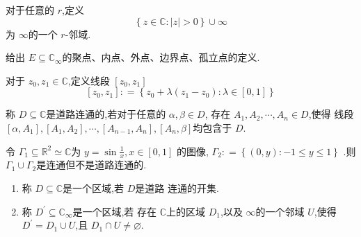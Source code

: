 \documentclass[../../复变函数.tex]{subfiles}
\begin{document}
\begin{definition}
    对于任意的 \(  r   \),定义 \[
    \left\{ z \in \mathbb{C} : \left| z \right|>0  \right\}\cup \infty
    \] 为 \(  \infty  \)的一个 \(  r  \)-邻域.  
\end{definition}

\begin{exercise}
    给出 \(  E\subseteq \mathbb{C} _{\infty}  \)的聚点、内点、外点、边界点、孤立点的定义. 
\end{exercise}

\hspace*{\fill} 


\begin{definition}
    对于 \(  z_0,z_1 \in \mathbb{C}   \),定义线段 \(  \left[ z_0,z_1 \right]   \) \[
    \left[ z_0,z_1 \right]: =  \left\{ z_0+ \lambda \left( z_1-z_0 \right): \lambda \in \left[ 0,1 \right]   \right\} 
    \]  
\end{definition}

\begin{definition}
    称 \(  D\subseteq \mathbb{C}   \)是道路连通的,若对于任意的 \(  \alpha ,\beta  \in D  \),  存在 \(  A_1,A_2,\cdots ,A_{n} \in D  \),使得 
    线段 \(  [\alpha ,A_1],[A_1,A_2],\cdots ,[A_{n-1},A_{n}],[A_{n},\beta ]  \)均包含于 \(  D  \).   
\end{definition}

\begin{example}[(拓扑学家的正弦曲线)]
    令 \(   \Gamma _1 \subseteq \mathbb{R} ^{2}  \simeq \mathbb{C} \)为 \(  y=  \sin \frac{1}{x}  ,x\in [0,1]\)  的图像, \(   \Gamma _2 : =  \left\{ \left( 0,y \right): -1\le y\le 1  \right\}  \)
    .则 \(   \Gamma _1 \cup  \Gamma _2   \)是连通但不是道路连通的.  
\end{example}

\hspace*{\fill} 

\begin{definition}
   \begin{enumerate}
    \item  称 \(  D \subseteq \mathbb{C}   \)是一个区域,若 \(  D  \)是道路  连通的开集.
    \item 称 \(  D^{\prime} \subseteq \mathbb{C} _{\infty}  \)是一个区域,若 存在 \(  \mathbb{C}   \)上的区域 \(  D_1  \),以及 \(  \infty  \)的一个邻域 \(  U  \),使得 \(  D^{\prime}  =  D_1\cup U  \),且 \(  D_1\cap U \neq \varnothing  \).       
   \end{enumerate}
   
\end{definition}
\end{document}
